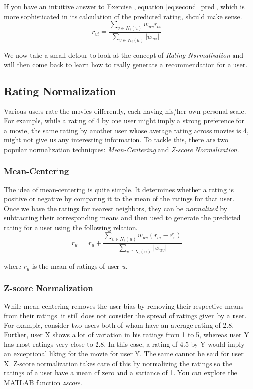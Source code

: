 If you have an intuitive answer to Exercise , equation  \ref{eq:second_pred}, which is more sophisticated in its calculation of the predicted rating, should make sense.
\begin{equation} \label{eq:second_pred}
r_{ui} = \frac
{\sum_{v \in{N_{i}(u)}}^{}{w_{uv}r_{vi}}}
{\sum_{v \in{N_{i}(u)}}^{}{|w_{uv}|}}
\end{equation}

We now take a small detour to look at the concept of \textit{Rating Normalization} and will then come back to learn how to really generate a recommendation for a user.

\subsection{Rating Normalization}
Various users rate the movies differently, each having his/her own personal scale. For example, while a rating of 4 by one user might imply a strong preference for a movie, the same rating by another user whose average rating across movies is 4, might not give us any interesting information. To tackle this, there are two popular normalization techniques: \textit{Mean-Centering} and \textit{Z-score Normalization}.

\subsubsection{Mean-Centering}
The idea of mean-centering is quite simple. It determines whether a rating is positive or negative by comparing it to the mean of the ratings for that user. Once we have the ratings for nearest neighbors, they can be \textit{normalized} by subtracting their corresponding means and then used to generate the predicted rating for a user using the following relation.
\begin{equation}
r_{ui} = \bar{r_{u}} + \frac
{\sum_{v \in{N_{i}(u)}}^{}{w_{uv}(r_{vi} - \bar{r_{v}})}}
{\sum_{v \in{N_{i}(u)}}^{}{|w_{uv}|}}
\end{equation}

where $\bar{r_{u}}$ is the mean of ratings of user \textit{u}.

\subsubsection{Z-score Normalization}
 While mean-centering removes the user bias by removing their respective means from their ratings, it still does not consider the spread of ratings given by a user. For example, consider two users both of whom have an average rating of 2.8. Further, user X shows a lot of variation in his ratings from 1 to 5, whereas user Y has most ratings very close to 2.8. In this case, a rating of 4.5 by Y would imply an exceptional liking for the movie for user Y. The same cannot be said for user X. Z-score normalization takes care of this by normalizing the ratings so the ratings of a user have a mean of zero and a variance of 1. You can explore the MATLAB function \textit{zscore}.
 
